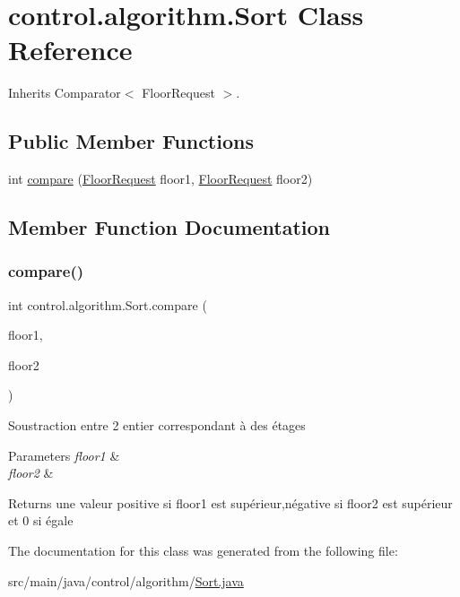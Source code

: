 \hypertarget{classcontrol_1_1algorithm_1_1_sort}{}\section{control.\+algorithm.\+Sort Class Reference}
\label{classcontrol_1_1algorithm_1_1_sort}


Inherits Comparator$<$ Floor\+Request $>$.

\subsection*{Public Member Functions}
\begin{DoxyCompactItemize}
\item 
int \mbox{\hyperlink{classcontrol_1_1algorithm_1_1_sort_a7b8bfc4d73475992e728addc4cc7c9a4}{compare}} (\mbox{\hyperlink{classcontrol_1_1command_1_1_floor_request}{Floor\+Request}} floor1, \mbox{\hyperlink{classcontrol_1_1command_1_1_floor_request}{Floor\+Request}} floor2)
\end{DoxyCompactItemize}


\subsection{Member Function Documentation}
\mbox{\label{classcontrol_1_1algorithm_1_1_sort_a7b8bfc4d73475992e728addc4cc7c9a4}} 
\subsubsection{\texorpdfstring{compare()}{compare()}}
{\footnotesize\ttfamily int control.\+algorithm.\+Sort.\+compare (\begin{DoxyParamCaption}\item[{\mbox{\hyperlink{classcontrol_1_1command_1_1_floor_request}{Floor\+Request}}}]{floor1,  }\item[{\mbox{\hyperlink{classcontrol_1_1command_1_1_floor_request}{Floor\+Request}}}]{floor2 }\end{DoxyParamCaption})}

Soustraction entre 2 entier correspondant à des étages 
\begin{DoxyParams}{Parameters}
{\em floor1} & \\
\hline
{\em floor2} & \\
\hline
\end{DoxyParams}
\begin{DoxyReturn}{Returns}
une valeur positive si floor1 est supérieur,négative si floor2 est supérieur et 0 si égale 
\end{DoxyReturn}


The documentation for this class was generated from the following file\+:\begin{DoxyCompactItemize}
\item 
src/main/java/control/algorithm/\mbox{\hyperlink{_sort_8java}{Sort.\+java}}\end{DoxyCompactItemize}
